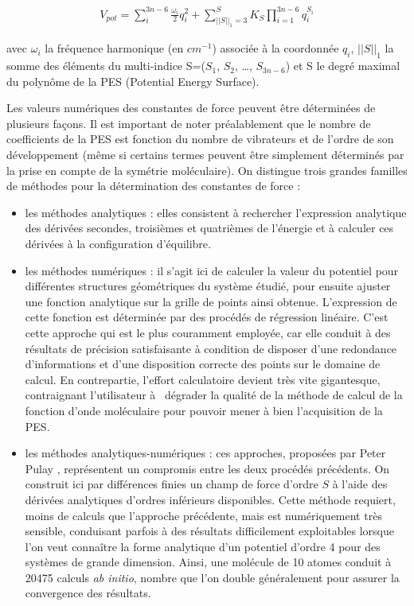 \begin{align} \label{V-Nielsen}
V_{pot} = \sum_i^{3n-6} \frac{\omega_i}{2} q_i^2 + \sum_{{\vert \vert S \vert \vert}_1 = 3}^{S} K_S \prod_{i=1}^{3n-6} q_i^{S_i}
\end{align}

avec $\omega_i$ la fréquence harmonique (en $cm^{-1}$) associée à la coordonnée $q_i$, ${\vert \vert S \vert \vert}_1$ la somme des éléments du multi-indice S=($S_1$, $S_2$, …, $S_{3n-6}$) et S le degré maximal du polynôme de la PES (Potential Energy Surface). 

Les valeurs numériques des constantes de force peuvent être déterminées de plusieurs façons. Il est important de noter préalablement que le nombre de coefficients de la PES est fonction du nombre de vibrateurs et de l’ordre de son développement (même si certains termes peuvent être simplement déterminés par la prise en compte de la symétrie moléculaire). On distingue trois grandes familles de méthodes pour la détermination des constantes de force : 
\begin{itemize}
\item les méthodes analytiques : elles consistent à rechercher l’expression analytique des dérivées secondes, troisièmes et quatrièmes de l’énergie et à calculer ces dérivées à la configuration d’équilibre. \\
\item les méthodes numériques : il s’agit ici de calculer la valeur du potentiel pour différentes structures géométriques du système étudié, pour ensuite ajuster une fonction analytique sur la grille de points ainsi obtenue. L’expression de cette fonction est déterminée par des procédés de régression linéaire. C’est cette approche qui est le plus couramment employée, car elle conduit à des résultats de précision satisfaisante à condition de disposer d’une redondance d’informations et d’une disposition correcte des points sur le domaine de calcul. En contrepartie, l’effort calculatoire devient très vite gigantesque, contraignant l’utilisateur à \og dégrader \fg{} la qualité de la méthode de calcul de la fonction d’onde moléculaire pour pouvoir mener à bien l’acquisition de la PES. \\
\item les méthodes analytiques-numériques : ces approches, proposées par Peter Pulay \cite{pulay1969ab}, représentent un compromis entre les deux procédés précédents. On construit ici par différences finies un champ de force d’ordre $S$ à l’aide des dérivées analytiques d’ordres inférieurs disponibles. Cette méthode requiert, moins de calculs que l’approche précédente, mais est numériquement très sensible, conduisant parfois à des résultats difficilement exploitables lorsque l’on veut connaître la forme analytique d’un potentiel d’ordre 4 pour des systèmes de grande dimension. Ainsi, une molécule de 10 atomes conduit à 20475 calculs \textit{ab initio}, nombre que l’on double généralement pour assurer la convergence des résultats. 
\end{itemize}
